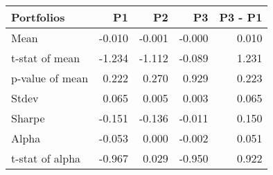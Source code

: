 \begin{tabular}{lrrrr}
\toprule
Portfolios & P1 & P2 & P3 & P3 - P1 \\
\midrule
Mean & -0.010 & -0.001 & -0.000 & 0.010 \\
t-stat of mean & -1.234 & -1.112 & -0.089 & 1.231 \\
p-value of mean & 0.222 & 0.270 & 0.929 & 0.223 \\
Stdev & 0.065 & 0.005 & 0.003 & 0.065 \\
Sharpe & -0.151 & -0.136 & -0.011 & 0.150 \\
Alpha & -0.053 & 0.000 & -0.002 & 0.051 \\
t-stat of alpha & -0.967 & 0.029 & -0.950 & 0.922 \\
\bottomrule
\end{tabular}
